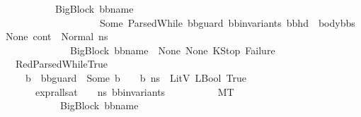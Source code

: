 \begin{isabellebody}
\ \ \ \ \ \ \ \ \ \ \ {\isasymlangle}{\isacharparenleft}{\kern0pt}{\isacharparenleft}{\kern0pt}BigBlock\ bb{\isacharunderscore}{\kern0pt}name\ {\isacharbrackleft}{\kern0pt}{\isacharbrackright}{\kern0pt}\ \isanewline
\ \ \ \ \ \ \ \ \ \ \ \ \ \ \ \ \ \ \ \ {\isacharparenleft}{\kern0pt}Some\ {\isacharparenleft}{\kern0pt}ParsedWhile\ bb{\isacharunderscore}{\kern0pt}guard\ bb{\isacharunderscore}{\kern0pt}invariants\ {\isacharparenleft}{\kern0pt}bb{\isacharunderscore}{\kern0pt}hd\ {\isacharhash}{\kern0pt}\ body{\isacharunderscore}{\kern0pt}bbs{\isacharparenright}{\kern0pt}{\isacharparenright}{\kern0pt}{\isacharparenright}{\kern0pt}\ None{\isacharparenright}{\kern0pt}{\isacharcomma}{\kern0pt}\ cont{}{\isacharcomma}{\kern0pt}\ \ Normal\ n{\isacharunderscore}{\kern0pt}s{\isacharparenright}{\kern0pt}{\isasymrangle}\ {\isasymlongrightarrow}\ \isanewline
\ \ \ \ \ \ \ \ \ \ \ \ \ \ {\isacharparenleft}{\kern0pt}{\isacharparenleft}{\kern0pt}BigBlock\ bb{\isacharunderscore}{\kern0pt}name\ {\isacharbrackleft}{\kern0pt}{\isacharbrackright}{\kern0pt}\ None\ None{\isacharparenright}{\kern0pt}{\isacharcomma}{\kern0pt}\ KStop{\isacharcomma}{\kern0pt}\ Failure{\isacharparenright}{\kern0pt}{\isachardoublequoteclose}\isanewline
\isanewline
\ \ {\isacharbar}{\kern0pt}\ RedParsedWhileTrue{\isacharcolon}{\kern0pt}\ \isanewline
\ \ \ \ {\isachardoublequoteopen}{\isasymlbrakk}{\isasymAnd}\ b{\isachardot}{\kern0pt}\ \ bb{\isacharunderscore}{\kern0pt}guard\ {\isacharequal}{\kern0pt}\ {\isacharparenleft}{\kern0pt}Some\ b{\isacharparenright}{\kern0pt}\ {\isasymLongrightarrow}\ {\isasymLambda}{\isacharcomma}{\kern0pt}{\isasymGamma}{\isacharcomma}{\kern0pt}{\isasymOmega}\ {\isasymturnstile}\ {\isasymlangle}b{\isacharcomma}{\kern0pt}\ n{\isacharunderscore}{\kern0pt}s{\isasymrangle}\ {\isasymDown}\ LitV\ {\isacharparenleft}{\kern0pt}LBool\ True{\isacharparenright}{\kern0pt}{\isacharsemicolon}{\kern0pt}\ \isanewline
\ \ \ \ \ \ \ {\isacharparenleft}{\kern0pt}expr{\isacharunderscore}{\kern0pt}all{\isacharunderscore}{\kern0pt}sat\ {\isasymLambda}\ {\isasymGamma}\ {\isasymOmega}\ n{\isacharunderscore}{\kern0pt}s\ bb{\isacharunderscore}{\kern0pt}invariants{\isacharparenright}{\kern0pt}\ {\isasymrbrakk}\ \isanewline
\ \ \ \ \ \ \ {\isasymLongrightarrow}\ M{\isacharcomma}{\kern0pt}{\isasymLambda}{\isacharcomma}{\kern0pt}{\isasymGamma}{\isacharcomma}{\kern0pt}{\isasymOmega}{\isacharcomma}{\kern0pt}T\ {\isasymturnstile}\ \isanewline
\ \ \ \ \ \ \ \ \ \ \ \ {\isasymlangle}{\isacharparenleft}{\kern0pt}{\isacharparenleft}{\kern0pt}BigBlock\ bb{\isacharunderscore}{\kern0pt}name\ {\isacharbrackleft}{\kern0pt}{\isacharbrackright}{\kern0pt}\ \isanewline

\end{isabellebody}
